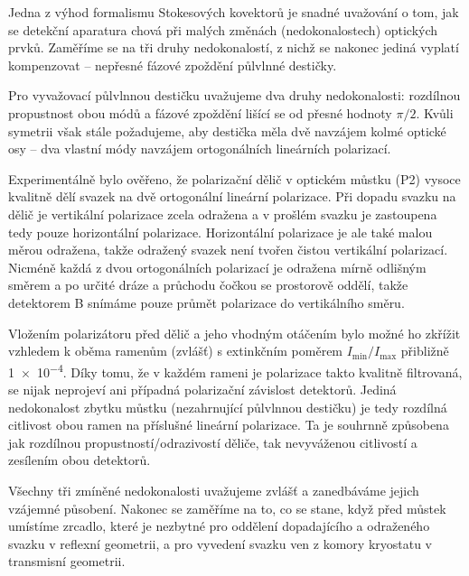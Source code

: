 Jedna z výhod formalismu Stokesových kovektorů je snadné uvažování o tom, jak se detekční aparatura chová při malých změnách (nedokonalostech) optických prvků.
Zaměříme se na tři druhy nedokonalostí, z nichž se nakonec jediná vyplatí kompenzovat -- nepřesné fázové zpoždění půlvlnné destičky.

Pro vyvažovací půlvlnnou destičku uvažujeme dva druhy nedokonalosti: rozdílnou propustnost obou módů a fázové zpoždění lišící se od přesné hodnoty $\pi/2$.
Kvůli symetrii však stále požadujeme, aby destička měla dvě navzájem kolmé optické osy -- dva vlastní módy navzájem ortogonálních lineárních polarizací.

Experimentálně bylo ověřeno, že polarizační dělič v optickém můstku (P2) vysoce kvalitně dělí svazek na dvě ortogonální lineární polarizace.
Při dopadu svazku na dělič je vertikální polarizace zcela odražena a v prošlém svazku je zastoupena tedy pouze horizontální polarizace.
Horizontální polarizace je ale také malou měrou odražena, takže odražený svazek není tvořen čistou vertikální polarizací. 
Nicméně každá z dvou ortogonálních polarizací je odražena mírně odlišným směrem a po určité dráze a průchodu čočkou se prostorově oddělí, takže detektorem B snímáme pouze průmět polarizace do vertikálního směru.

Vložením polarizátoru před dělič a jeho vhodným otáčením bylo možné ho zkřížit vzhledem k oběma ramenům (zvlášť) s extinkčním poměrem $I_\textrm{min}/I_\textrm{max}$ přibližně \num{1e-4}.
Díky tomu, že v každém rameni je polarizace takto kvalitně filtrovaná, se nijak neprojeví ani případná polarizační závislost detektorů.
Jediná nedokonalost zbytku můstku (nezahrnující půlvlnnou destičku) je tedy rozdílná citlivost obou ramen na příslušné lineární polarizace.
Ta je souhrnně způsobena jak rozdílnou propustností/odrazivostí děliče, tak nevyváženou citlivostí a zesílením obou detektorů.

Všechny tři zmíněné nedokonalosti uvažujeme zvlášť a zanedbáváme jejich vzájemné působení.
Nakonec se zaměříme na to, co se stane, když před můstek umístíme zrcadlo, které je nezbytné pro oddělení dopadajícího a odraženého svazku v reflexní geometrii, a pro vyvedení svazku ven z komory kryostatu v transmisní geometrii.


